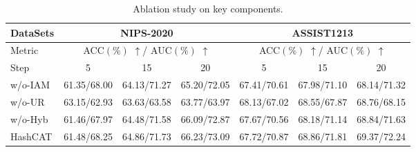 
\begin{table}[!t] 

  \centering
  \caption{Ablation study on key components.}
  \vspace{-10pt}
  \footnotesize
  \setlength{\tabcolsep}{1pt}
  \vspace{1pt}
    \begin{tabular}{l|r|r|r|r|r|r}
    \hline
    \toprule
    \toprule
    DataSets & \multicolumn{3}{c|}{NIPS-2020} & \multicolumn{3}{c}{ASSIST1213} \\
    \midrule
    Metric & \multicolumn{3}{c|}{ACC$(\%)$ \textcolor{black}{$\uparrow$}/ AUC$(\%)$ \textcolor{black}{$\uparrow$}}& \multicolumn{3}{c}{ACC$(\%)$ \textcolor{black}{$\uparrow$}/ AUC$(\%)$ \textcolor{black}{$\uparrow$}}
 \\
    \midrule
    Step  & \multicolumn{1}{c|}{5} & \multicolumn{1}{c|}{15} & \multicolumn{1}{c|}{20} & \multicolumn{1}{c|}{5} & \multicolumn{1}{c|}{15} & \multicolumn{1}{c}{20} \\
    \midrule
    w/o-IAM & 61.35/68.00 & 64.13/71.27&65.20/72.05 & 67.41/70.61 &67.98/71.10   & 68.14/71.32\\
    \midrule
    w/o-UR & 63.15/62.93 & 63.63/63.58 &   63.77/63.97    &  68.13/67.02     &    68.55/67.87  & 68.76/68.15 \\
    \midrule
    w/o-Hyb & 61.46/67.97 &64.48/71.58 & 66.09/72.87 &    67.67/70.56   &      68.18/71.14 &68.84/71.63  \\
    \midrule
    HashCAT & 61.48/68.25& 64.86/71.73 &  66.23/73.09     & 67.72/70.87      &   68.86/71.81    & 69.37/72.24 \\
    \hline   
  
    \bottomrule
    \end{tabular}%
    
  \label{tab:addlabel}%
  \vspace{-5mm}
\end{table}%
